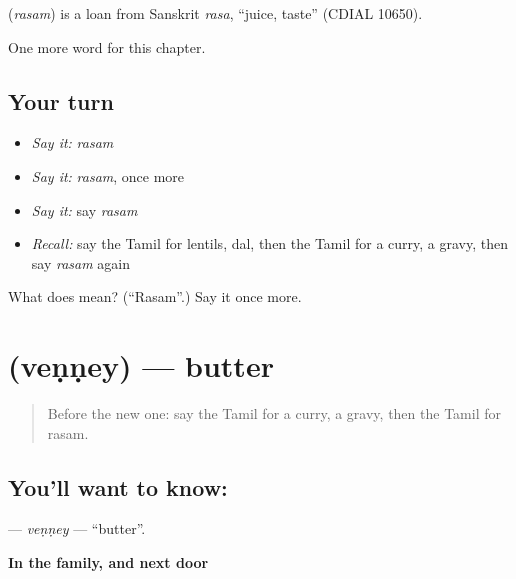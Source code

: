 \begin{cousinweb}
\textbf{} (\emph{rasam}) is a loan from Sanskrit \emph{rasa}, \textquotedblleft{}juice, taste\textquotedblright{} (CDIAL 10650).
\end{cousinweb}

\begin{grammarlens}[title={What you've built}]
One more word for this chapter.
\end{grammarlens}

\subsection*{Your turn}
\begin{itemize}
\raggedright
  \item \emph{Say it:} \emph{rasam}
  \item \emph{Say it:} \emph{rasam}, once more
  \item \emph{Say it:} say \emph{rasam}
  \item \emph{Recall:} say the Tamil for lentils, dal, then the Tamil for a curry, a gravy, then say \emph{rasam} again
\end{itemize}

\begin{tcolorbox}[breakable,colback=teal!4,colframe=teal!35!black,title={Before you move on}]
What does  mean? (\textquotedblleft{}Rasam\textquotedblright{}.) Say it once more.
\end{tcolorbox}
\section[\texorpdfstring{\ta{வெண்ணெய்} (veṇṇey)}{வெண்ணெய் (veṇṇey)}]{ (veṇṇey) — butter}

\label{lesson:TA-C122-venney}



\begin{quote}
Before the new one: say the Tamil for a curry, a gravy, then the Tamil for rasam.
\end{quote}

\subsection*{You'll want to know: }
\textbf{} — \emph{veṇṇey} — \textquotedblleft{}butter\textquotedblright{}.

\textbf{In the family, and next door}


